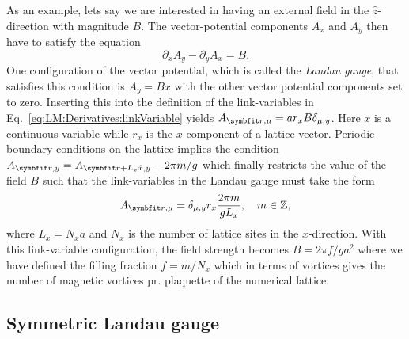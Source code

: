 As an example, lets say we are interested in having an external field in the $\hat{z}$-direction with magnitude $B$. The vector-potential components $A_x$ and $A_y$ then have to satisfy
the equation
\begin{equation}
    \label{eq:LM:Field:vectorPotentialCondition}
    \partial_xA_y - \partial_yA_x = B.
\end{equation}
One configuration of the vector potential, which is called the \emph{Landau gauge}, that satisfies this condition is $A_y = Bx$ with the other vector potential components set to zero. Inserting
this into the definition of the link-variables in Eq.~\eqref{eq:LM:Derivatives:linkVariable} yields $A_{\v{r},\mu} = ar_xB\delta_{\mu,y}$. Here $x$ is a continuous variable while
$r_x$ is the $x$-component of a lattice vector. Periodic boundary conditions on the lattice implies the condition $A_{\v{r},y} = A_{\v{r}+L_x\hat{x},y} - 2\pi m/g$
which finally restricts the value of the field $B$ such that the link-variables in the Landau
gauge must take the form
\begin{equation}
    \label{eq:LM:Field:LandauGauge}
    A_{\v{r},\mu} = \delta_{\mu,y}r_x\frac{2\pi m}{gL_x},\quad m\in\mathbb{Z},
\end{equation}
where $L_x=N_xa$ and $N_x$ is the number of lattice sites in the $x$-direction. With this link-variable configuration, the field strength becomes $B = 2\pi f/ga^2$ where we have defined
the filling fraction $f=m/N_x$ which in terms of vortices gives the number of magnetic vortices pr. plaquette of the numerical lattice.

\subsection{Symmetric Landau gauge}
\label{sec:LM:Field:SymmLandauGauge}

